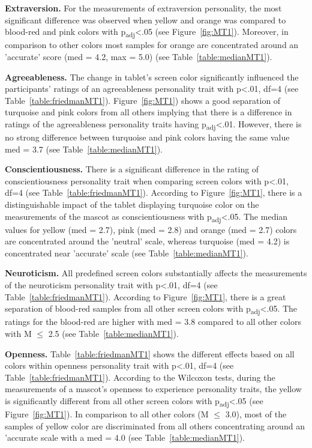 \par\textbf{Extraversion.}
For the measurements of extraversion personality,
the most significant difference was observed when yellow and orange was compared to
blood-red and pink colors with p\textsubscript{adj}<.05 (see Figure~\ref{fig:MT1}).
Moreover, in comparison to other colors most samples for orange are concentrated around
an 'accurate' score (med = 4.2, max = 5.0) (see Table~\ref{table:medianMT1}).

\par\textbf{Agreeableness.}
The change in tablet's screen color significantly influenced the participants' ratings of
an agreeableness personality trait with p<.01, df=4 (see Table~\ref{table:friedmanMT1}).
Figure~\ref{fig:MT1}) shows a good separation of turquoise and pink colors
from all others implying that there is a difference in ratings of the
agreeableness personality traits having p\textsubscript{adj}<.01.
However, there is no strong difference between turquoise and pink colors having
the same value med = 3.7 (see Table~\ref{table:medianMT1}).

\par\textbf{Conscientiousness.}
There is a significant difference in the rating of conscientiousness personality trait
when comparing screen colors with p<.01, df=4 (see Table~\ref{table:friedmanMT1}).
According to Figure~\ref{fig:MT1}, there is a distinguishable impact of the
tablet displaying turquoise color on the measurements of the mascot as conscientiousness with p\textsubscript{adj}<.05.
The median values for yellow (med = 2.7), pink (med = 2.8) and orange (med = 2.7) colors are
concentrated around the 'neutral' scale, whereas turquoise (med = 4.2)
is concentrated near 'accurate' scale (see Table~\ref{table:medianMT1}).

\par\textbf{Neuroticism.}
All predefined screen colors substantially affects the measurements of the neuroticism personality
trait with p<.01, df=4 (see Table~\ref{table:friedmanMT1}).
According to Figure~\ref{fig:MT1}, there is a great separation of blood-red
samples from all other screen colors with p\textsubscript{adj}<.05.
The ratings for the blood-red are higher with med = 3.8 compared to all other colors
with M $\leq$ 2.5 (see Table~\ref{table:medianMT1}).

\par\textbf{Openness.}
Table~\ref{table:friedmanMT1} shows the different effects based on all colors within openness
personality trait with p<.01, df=4 (see Table~\ref{table:friedmanMT1}).
According to the Wilcoxon tests, during the measurements of a mascot's openness to experience
personality traits, the yellow is significantly different from all other screen
colors with p\textsubscript{adj}<.05 (see Figure~\ref{fig:MT1}).
In comparison to all other colors (M $\leq$ 3.0), most of the samples of yellow color are discriminated
from all others concentrating around an 'accurate scale with a med = 4.0 (see Table~\ref{table:medianMT1}).

